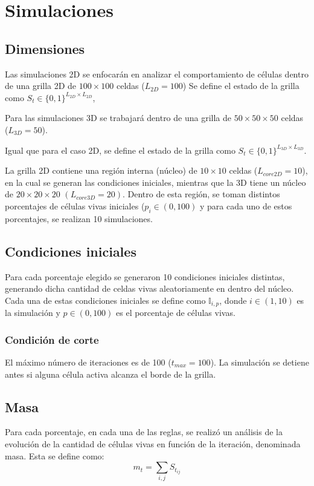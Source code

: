 \section{Simulaciones}
\label{sec:simulaciones}

\subsection{Dimensiones}
\label{subsec:acdim}
Las simulaciones 2D se enfocarán en analizar el comportamiento de células dentro de una grilla 2D de $100 \times 100$ celdas ($L_{2D} = 100$)
Se define el estado de la grilla como $S_t \in \{0,1\}^{L_{2D}\times L_{2D}}$,

Para las simulaciones 3D se trabajará dentro de una grilla de $50 \times 50 \times 50$ celdas ($L_{3D} = 50$).

Igual que para el caso 2D, se define el estado de la grilla como $S_t \in \{0,1\}^{L_{3D}\times L_{3D}}$.

La grilla 2D contiene una región interna (núcleo) de $10 \times 10$ celdas ($L_{core2D} = 10$), en la cual se generan las condiciones iniciales,
mientras que la 3D tiene un núcleo de $20 \times 20 \times 20$ $(L_{core3D} = 20)$.
Dentro de esta región, se toman distintos porcentajes de células vivas iniciales ($p_i \in (0, 100)$ y para cada uno de estos porcentajes, se realizan 10 simulaciones.

\subsection{Condiciones iniciales}
\label{subsec:acini}
Para cada porcentaje elegido se generaron 10 condiciones iniciales distintas, generando dicha cantidad de celdas vivas aleatoriamente en dentro del núcleo.
Cada una de estas condiciones iniciales se define como $\mathbb{I}_{i,p}$, donde $i \in (1, 10)$ es la simulación y $p \in (0, 100)$ es el porcentaje de células vivas.

\subsubsection{Condición de corte}
\label{subsubsec:ac2corte}
El máximo número de iteraciones es de 100 ($t_{max} = 100$).
La simulación se detiene antes si alguna célula activa alcanza el borde de la grilla.

\subsection{Masa}
Para cada porcentaje, en cada una de las reglas, se realizó un análisis de la evolución de la cantidad de células vivas en función de la iteración, denominada masa.
Esta se define como:
\begin{equation}
m_t = \sum_{i,j}{S_{t_{ij}}}
\end{equation}

